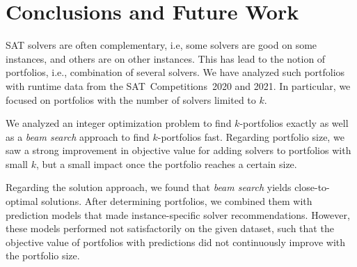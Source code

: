 \documentclass[conference]{IEEEtran}
\begin{document}
\section{Conclusions and Future Work}
\label{sec:conclusion}
SAT solvers are often complementary, i.e, some solvers are good on some instances, and others are on other instances.
This has lead to the notion of portfolios, i.e., combination of several solvers. %
We have analyzed such portfolios with runtime data from the SAT~Competitions~2020 and 2021. %
In particular, we focused on portfolios with the number of solvers limited to $k$. %

We analyzed an integer optimization problem %
to find $k$-portfolios exactly as well as a \emph{beam search} approach to find $k$-portfolios fast. %
Regarding portfolio size, we saw a strong improvement in objective value for adding solvers to portfolios with small $k$, but a small impact once the portfolio reaches a certain size.

Regarding the solution approach, we found that \emph{beam search} yields close-to-optimal solutions.
After determining portfolios, we combined them with prediction models that made instance-specific solver recommendations.
However, these models performed not satisfactorily on the given dataset, such that the objective value of portfolios with predictions did not continuously improve with the portfolio size.
\end{document}
